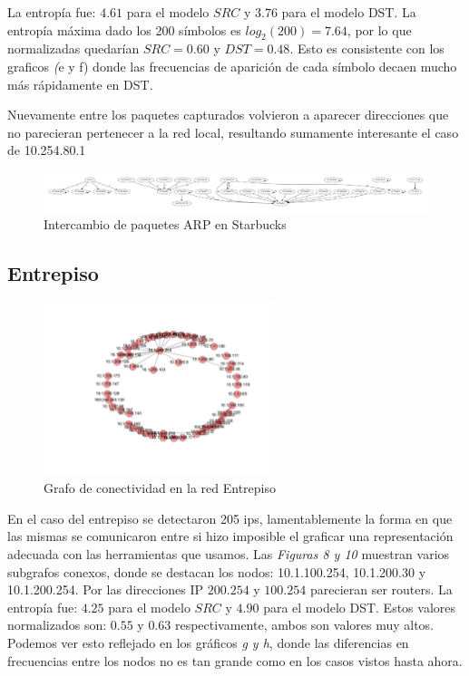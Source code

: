 La entrop\'ia fue: $4.61$ para el modelo $SRC$ y $3.76$ para el modelo
DST. La entrop\'ia m\'axima dado los 200 s\'imbolos es $log_2(200)=7.64$,
por lo que normalizadas quedarían $SRC=0.60$ y $DST=0.48$. Esto es 
consistente con los graficos \emph(e y f) donde las frecuencias de aparici\'on
de cada s\'imbolo decaen mucho m\'as r\'apidamente en DST.

Nuevamente entre los paquetes capturados volvieron a aparecer direcciones que
no parecieran pertenecer a la red local, resultando sumamente interesante el caso
de 10.254.80.1


\begin{figure}[H]
	\center
	\includegraphics[width=1.\textwidth]{resultados/starbucks/conectividad.pdf}
	\caption{Intercambio de paquetes ARP en Starbucks}
\end{figure}

\subsection{Entrepiso}

\begin{figure}[h!]
    \center
    \includegraphics[width=0.6\textwidth]{resultados/entrepiso/conectividadNX.pdf}
    \caption{Grafo de conectividad en la red Entrepiso}
\end{figure}

En el caso del entrepiso se detectaron 205 ips, lamentablemente la forma en que
las mismas se comunicaron entre si hizo imposible el graficar una representaci\'on
adecuada con las herramientas que usamos. Las \emph{Figuras 8 y 10} muestran
varios subgrafos conexos, donde se destacan los nodos: 10.1.100.254, 10.1.200.30
y 10.1.200.254. Por las direcciones IP $200.254$ y $100.254$ parecieran ser routers.
La entrop\'ia fue: $4.25$ para el
modelo $SRC$ y $4.90$ para el modelo DST. Estos valores normalizados son: 
$0.55$ y $0.63$ respectivamente, ambos son valores muy altos. 
Podemos ver esto reflejado en los gr\'aficos \emph{g y h}, donde las diferencias
en frecuencias entre los nodos no es tan grande como en los casos vistos hasta
ahora.

